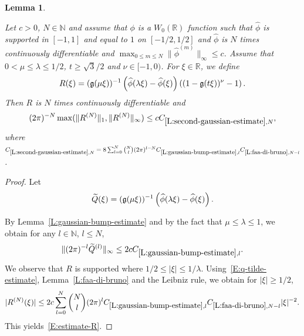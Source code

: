 \documentclass[12pt,reqno]{amsart}
\theoremstyle{plain}
\newtheorem{lemma}[theorem]{Lemma}
\numberwithin{equation}{section}
\theoremstyle{remark}
\newcommand{\uses}[1]{}
\newcommand{\usesdefs}[1]{}
\newcommand{\leanok}{}
\newcommand{\lean}[1]{}
\newcommand{\R}{{\mathbb R}}
\begin{document}
\begin{lemma}\label{L:second-gaussian-estimate}\uses{L:gaussian-bump-estimate,L:faa-di-bruno}\usesdefs{gaussian,auto:Wiener-space-definition}
\lean{Auto.secondGaussianEstimate}
\leanok
Let $c>0$, $N\in \mathbb N$ and assume that $\phi$ is a $W_0(\R)$ function such that
$\widehat{\phi}$ is supported in $[-1,1]$ and equal to $1$ on $[-1/2,1/2]$ and $\widehat{\phi}$ is $N$ times continuously differentiable and $\max_{0\leq m \leq N} \|\widehat{\phi}^{(m)}\|_{\infty} \leq c$.
Assume that $0<\mu \leq \lambda \leq 1/2$, $t\geq \sqrt{3}/2$ and $\nu \in [-1,0)$. For $\xi \in \R$, we define
\begin{equation}\label{auto:second-Gaussian-multiplier}
R(\xi)=(\mathfrak{g}(\mu\xi))^{-1}\left(\widehat{\phi}(\lambda\xi)-\widehat{\phi}(\xi)\right)\left((1-\mathfrak{g}(t\xi))^{\nu} -1\right).
\end{equation}
Then $R$ is $N$ times continuously differentiable and
\begin{equation}\label{E:estimate-R}
(2\pi)^{-N} \max(\|R^{(N)}\|_1,\|R^{(N)}\|_\infty) \leq cC_{\ref{L:second-gaussian-estimate},N},
\end{equation}
where $C_{\ref{L:second-gaussian-estimate},N}=8\sum_{l=0}^N \binom{N}{l} (2\pi)^{l-N} C_{\ref{L:gaussian-bump-estimate},l} C_{\ref{L:faa-di-bruno},N-l}$.

\end{lemma}


\begin{proof}
Let
\[
\widetilde{Q}(\xi)=(\mathfrak{g}(\mu\xi))^{-1}\left(\widehat{\phi}(\lambda\xi)-\widehat{\phi}(\xi)\right).
\]


By Lemma~\ref{L:gaussian-bump-estimate} and by the fact that $\mu \leq \lambda \leq 1$, we obtain for any $l\in \mathbb N$, $l\leq N$,
\begin{equation}\label{E:q-tilde-estimate}
\|(2\pi)^{-l}\widetilde{Q}^{(l)}\|_{\infty} \leq 2c C_{\ref{L:gaussian-bump-estimate},l}.
\end{equation}
We observe that $R$ is supported where $1/2\le|\xi|\le1/\lambda$.
Using~\eqref{E:q-tilde-estimate}, Lemma~\ref{L:faa-di-bruno} and the Leibniz rule, we obtain for $|\xi|\geq 1/2$,
\[
|R^{(N)}(\xi)| \leq 2c\sum_{l=0}^N \binom{N}{l} (2\pi)^l C_{\ref{L:gaussian-bump-estimate},l} C_{\ref{L:faa-di-bruno},N-l} |\xi|^{-2}.
\]
This yields~\eqref{E:estimate-R}.
\end{proof}
\end{document}
